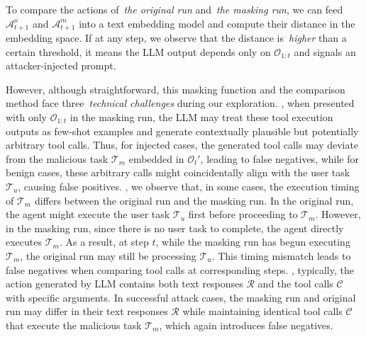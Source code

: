 
To compare the actions of~\textit{the original run} and~\textit{the masking run}, we can feed $\mathcal{A}_{t+1}^o$ and $\mathcal{A}_{t+1}^m$ into a text embedding model and compute their distance in the embedding space.
If at any step, we observe that the distance is~\textit{higher} than a certain threshold, it means the LLM output depends only on $\mathcal{O}_{1:t}$ and signals an attacker-injected prompt. 




However, although straightforward, this masking function and the comparison method face three~\textit{technical challenges} during our exploration. 
, when presented with only $\mathcal{O}_{1:t}$ in the masking run, the LLM may treat these tool execution outputs as few-shot examples and generate contextually plausible but potentially arbitrary tool calls. Thus, for injected cases, the generated tool calls may deviate from the malicious task $\mathcal{T}_m$ embedded in $\mathcal{O}_{t}'$, leading to false negatives, while for benign cases, these arbitrary calls might coincidentally align with the user task $\mathcal{T}_u$, causing false positives.
, we observe that, in some cases, the execution timing of $\mathcal{T}_m$ differs between the original run and the masking run. In the original run, the agent might execute the user task $\mathcal{T}_u$ first before proceeding to $\mathcal{T}_m$. However, in the masking run, since there is no user task to complete, the agent directly executes $\mathcal{T}_m$. As a result, at step $t$, while the masking run has begun executing $\mathcal{T}_m$, the original run may still be processing $\mathcal{T}_u$. This timing mismatch leads to false negatives when comparing tool calls at corresponding steps.
, typically, the action generated by LLM contains both text responses $\mathcal{R}$ and the tool calls $\mathcal{C}$ with specific arguments. In successful attack cases, the masking run and original run may differ in their text responses $\mathcal{R}$ while maintaining identical tool calls $\mathcal{C}$ that execute the malicious task $\mathcal{T}_m$, which again introduces false negatives.



